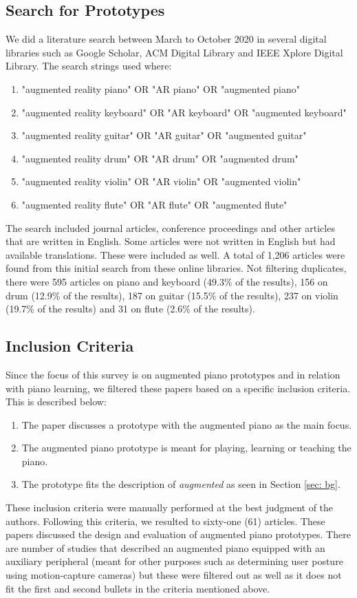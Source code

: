 \documentclass[sigchi, review]{acmart}
\begin{document}
\subsection{Search for Prototypes}
\label{subsec: search}
We did a literature search between March to October 2020 in several digital libraries such as Google Scholar, ACM Digital Library and IEEE Xplore Digital Library. The search strings used where:
\begin{enumerate}
    \item "augmented reality piano" OR "AR piano" OR "augmented piano" 
    \item "augmented reality keyboard" OR "AR keyboard" OR "augmented keyboard"
    \item "augmented reality guitar" OR "AR guitar" OR "augmented guitar"
    \item "augmented reality drum" OR "AR drum" OR "augmented drum"
    \item "augmented reality violin" OR "AR violin" OR "augmented violin"
    \item "augmented reality flute" OR "AR flute" OR "augmented flute"
\end{enumerate}
The search included journal articles, conference proceedings and other articles that are written in English. Some articles were not written in English but had available translations. These were included as well. A total of 1,206 articles were found from this initial search from these online libraries. Not filtering duplicates, there were 595 articles on piano and keyboard (49.3\% of the results), 156 on drum (12.9\% of the results), 187 on guitar (15.5\% of the results), 237 on violin (19.7\% of the results) and 31 on flute (2.6\% of the results). 

\subsection{Inclusion Criteria}
\label{subsec: criteria}
Since the focus of this survey is on augmented piano prototypes and in relation with piano learning, we filtered these papers based on a specific inclusion criteria. This is described below: 
\begin{enumerate}
    \item The paper discusses a prototype with the augmented piano as the main focus.  
    \item The augmented piano prototype is meant for playing, learning or teaching the piano.
    \item The prototype fits the description of \textit{augmented} as seen in Section \ref{sec: bg}.
\end{enumerate}
These inclusion criteria were manually performed at the best judgment of the authors. Following this criteria, we resulted to sixty-one (61) articles. These papers discussed the design and evaluation of augmented piano prototypes. There are number of studies that described an augmented piano equipped with an auxiliary peripheral (meant for other purposes such as determining user posture using motion-capture cameras) but these were filtered out as well as it does not fit the first and second bullets in the criteria mentioned above.  
\end{document}
